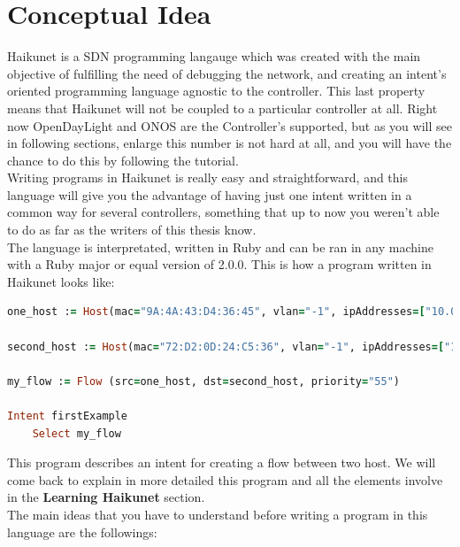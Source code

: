 \section{Conceptual Idea}

Haikunet is a SDN programming langauge which was created with the main objective of fulfilling the need of debugging the network, and creating an intent's oriented programming language agnostic to the controller. This last property means that Haikunet will not be coupled to a particular controller at all. Right now OpenDayLight and ONOS are the Controller's supported, but as you will see in following sections, enlarge this number is not hard at all, and you will have the chance to do this by following the tutorial.\\
Writing programs in Haikunet is really easy and straightforward, and this language will give you the advantage of having just one intent written in a common way for several controllers, something that up to now you weren't able to do as far as the writers of this thesis know.\\
The language is interpretated, written in Ruby and can be ran in any machine with a Ruby major or equal version of 2.0.0. This is how a program written in Haikunet looks like:

\begin{lstlisting}[language=Ruby,breaklines=true]
one_host := Host(mac="9A:4A:43:D4:36:45", vlan="-1", ipAddresses=["10.0.0.1"], elementId="of:0000000000000002", port="4")

second_host := Host(mac="72:D2:0D:24:C5:36", vlan="-1", ipAddresses=["10.0.0.4"], elementId="of:0000000000000003", port="4")

my_flow := Flow (src=one_host, dst=second_host, priority="55")

Intent firstExample
	Select my_flow
\end{lstlisting}

This program describes an intent for creating a flow between two host. We will come back to explain in more detailed this program and all the elements involve in the \textbf{Learning Haikunet} section.\\

The main ideas that you have to understand before writing a program in this language are the followings:

